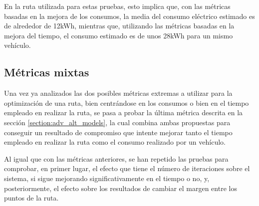 \documentclass[11pt,spanish,listoffigures,listoftables]{tfgetsinf}
\begin{document}
En la ruta utilizada para estas pruebas, esto implica que, con las métricas basadas en la mejora de los consumos, la media del consumo eléctrico estimado es de alrededor de 12kWh, mientras que, utilizando las métricas basadas en la mejora del tiempo, el consumo estimado es de unos 28kWh para un mismo vehículo.

\newpage
\subsection{Métricas mixtas}
\label{section:mix_model_tests}
Una vez ya analizados las dos posibles métricas extremas a utilizar para la optimización de una ruta, bien centrándose en los consumos o bien en el tiempo empleado en realizar la ruta, se pasa a probar la última métrica descrita en la sección \ref{section:adv_alt_models}, la cual combina ambas propuestas para conseguir un resultado de compromiso que intente mejorar tanto el tiempo empleado en realizar la ruta como el consumo realizado por un vehículo.

Al igual que con las métricas anteriores, se han repetido las pruebas para comprobar, en primer lugar, el efecto que tiene el número de iteraciones sobre el sistema, si sigue mejorando significativamente en el tiempo o no, y, posteriormente, el efecto sobre los resultados de cambiar el margen entre los puntos de la ruta.
\end{document}
